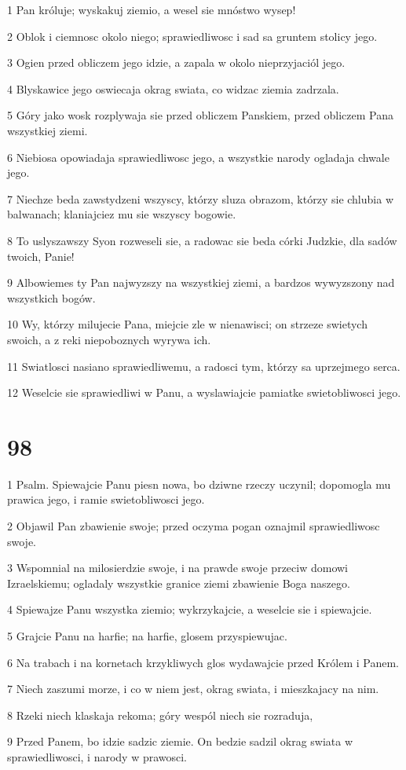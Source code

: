 \par 1 Pan króluje; wyskakuj ziemio, a wesel sie mnóstwo wysep!
\par 2 Oblok i ciemnosc okolo niego; sprawiedliwosc i sad sa gruntem stolicy jego.
\par 3 Ogien przed obliczem jego idzie, a zapala w okolo nieprzyjaciól jego.
\par 4 Blyskawice jego oswiecaja okrag swiata, co widzac ziemia zadrzala.
\par 5 Góry jako wosk rozplywaja sie przed obliczem Panskiem, przed obliczem Pana wszystkiej ziemi.
\par 6 Niebiosa opowiadaja sprawiedliwosc jego, a wszystkie narody ogladaja chwale jego.
\par 7 Niechze beda zawstydzeni wszyscy, którzy sluza obrazom, którzy sie chlubia w balwanach; klaniajciez mu sie wszyscy bogowie.
\par 8 To uslyszawszy Syon rozweseli sie, a radowac sie beda córki Judzkie, dla sadów twoich, Panie!
\par 9 Albowiemes ty Pan najwyzszy na wszystkiej ziemi, a bardzos wywyzszony nad wszystkich bogów.
\par 10 Wy, którzy milujecie Pana, miejcie zle w nienawisci; on strzeze swietych swoich, a z reki niepoboznych wyrywa ich.
\par 11 Swiatlosci nasiano sprawiedliwemu, a radosci tym, którzy sa uprzejmego serca.
\par 12 Weselcie sie sprawiedliwi w Panu, a wyslawiajcie pamiatke swietobliwosci jego.

\chapter{98}

\par 1 Psalm. Spiewajcie Panu piesn nowa, bo dziwne rzeczy uczynil; dopomogla mu prawica jego, i ramie swietobliwosci jego.
\par 2 Objawil Pan zbawienie swoje; przed oczyma pogan oznajmil sprawiedliwosc swoje.
\par 3 Wspomnial na milosierdzie swoje, i na prawde swoje przeciw domowi Izraelskiemu; ogladaly wszystkie granice ziemi zbawienie Boga naszego.
\par 4 Spiewajze Panu wszystka ziemio; wykrzykajcie, a weselcie sie i spiewajcie.
\par 5 Grajcie Panu na harfie; na harfie, glosem przyspiewujac.
\par 6 Na trabach i na kornetach krzykliwych glos wydawajcie przed Królem i Panem.
\par 7 Niech zaszumi morze, i co w niem jest, okrag swiata, i mieszkajacy na nim.
\par 8 Rzeki niech klaskaja rekoma; góry wespól niech sie rozraduja,
\par 9 Przed Panem, bo idzie sadzic ziemie. On bedzie sadzil okrag swiata w sprawiedliwosci, i narody w prawosci.

